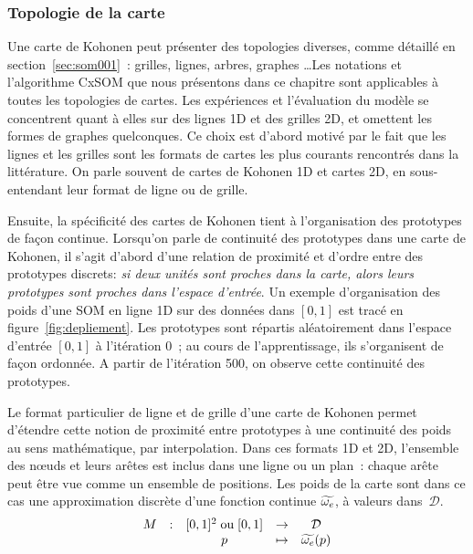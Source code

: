 \documentclass[../main]{subfiles}
\begin{document}
\subsubsection{Topologie de la carte}

Une carte de Kohonen peut présenter des topologies diverses, comme détaillé en section~\ref{sec:som001}~: grilles, lignes, arbres, graphes \dots Les notations et l'algorithme CxSOM que nous présentons dans ce chapitre sont applicables à toutes les topologies de cartes. Les expériences et l'évaluation du modèle se concentrent quant à elles sur des lignes 1D et des grilles 2D, et omettent les formes de graphes quelconques. Ce choix est d'abord motivé par le fait que les lignes et les grilles sont les formats de cartes les plus courants rencontrés dans la littérature. On parle souvent de cartes de Kohonen 1D et cartes 2D, en sous-entendant leur format de ligne ou de grille.

Ensuite, la spécificité des cartes de Kohonen tient à l'organisation des prototypes de façon continue. Lorsqu'on parle de continuité des prototypes dans une carte de Kohonen, il s'agit d'abord d'une relation de proximité et d'ordre entre des prototypes discrets: \emph{si deux unités sont proches dans la carte, alors leurs prototypes sont proches dans l'espace d'entrée}. Un exemple d'organisation des poids d'une SOM en ligne 1D sur des données dans $[0,1]$ est tracé en figure~\ref{fig:depliement}. Les prototypes sont répartis aléatoirement dans l'espace d'entrée $[0,1]$ à l'itération $0$~; au cours de l'apprentissage, ils s'organisent de façon ordonnée. A partir de l'itération 500, on observe cette continuité des prototypes.

Le format particulier de ligne et de grille d'une carte de Kohonen permet d'étendre cette notion de proximité entre prototypes à une continuité des poids au sens mathématique, par interpolation. Dans ces formats 1D et 2D, l'ensemble des n\oe{}uds et leurs arêtes est inclus dans une ligne ou un plan~: chaque arête peut être vue comme un ensemble de positions. Les poids de la carte sont dans ce cas une approximation discrète d'une fonction continue $\widetilde{\omega_e}$, à valeurs dans~$\mathcal{D}$.
\begin{equation*}
\begin{array}{ccccc}
M& : & [0,1]^2 \; \text{ou} \;[0,1] & \to &  \mathcal{D} \\
 & & p & \mapsto & \widetilde{\omega_e}(p) \\
\end{array}
\end{equation*}
\end{document}
